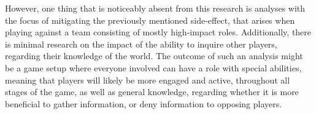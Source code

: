 However, one thing that is noticeably absent from this research is analyses
with the focus of mitigating the previously mentioned side-effect, that arises when playing against a team consisting of mostly high-impact roles. Additionally, there is minimal research on the impact of the ability to inquire other players, regarding their knowledge of the world. The outcome of such an analysis might be a game setup where everyone involved can have a role with special abilities, meaning that players will likely be more engaged and active, throughout all stages of the game, as well as general knowledge, regarding whether it is more beneficial to gather information, or deny information to opposing players. 